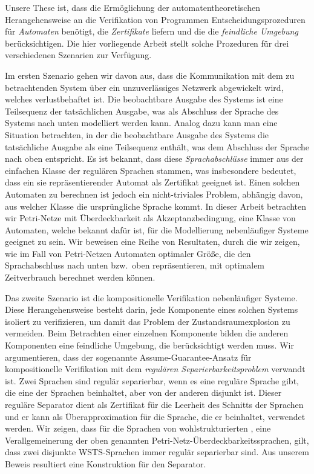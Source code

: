 \documentclass[../../diss.tex]{subfiles}
\begin{document}
{Unsere These ist, dass die Ermöglichung der automatentheoretischen Herangehensweise an die Verifikation von Programmen Entscheidungsprozeduren für \emph{Automaten} benötigt, die \emph{Zertifikate} liefern und die die \emph{feindliche Umgebung} berücksichtigen.
Die hier vorliegende Arbeit stellt solche Prozeduren für drei verschiedenen Szenarien zur Verfügung.

Im ersten Szenario gehen wir davon aus, dass die Kommunikation mit dem zu betrachtenden System über ein unzuverlässiges Netzwerk abgewickelt wird, welches verlustbehaftet ist.
Die beobachtbare Ausgabe des Systems ist eine Teilsequenz der tatsächlichen Ausgabe, was als Abschluss der Sprache des Systems nach unten modelliert werden kann.
Analog dazu kann man eine Situation betrachten, in der die beobachtbare Ausgabe des Systems die tatsächliche Ausgabe als eine Teilsequenz enthält, was dem Abschluss der Sprache nach oben entspricht.
Es ist bekannt, dass diese \emph{Sprachabschlüsse} immer aus der einfachen Klasse der regulären Sprachen stammen, was insbesondere bedeutet, dass ein sie repräsentierender Automat als Zertifikat geeignet ist.
Einen solchen Automaten zu berechnen ist jedoch ein nicht-triviales Problem, abhängig davon, aus welcher Klasse die ursprüngliche Sprache kommt.
In dieser Arbeit betrachten wir Petri-Netze mit Überdeckbarkeit als Akzeptanzbedingung, eine Klasse von Automaten, welche bekannt dafür ist, für die Modellierung nebenläufiger Systeme geeignet zu sein.
Wir beweisen eine Reihe von Resultaten, durch die wir zeigen, wie im Fall von Petri-Netzen Automaten optimaler Größe, die den Sprachabschluss nach unten bzw.~oben repräsentieren, mit optimalem Zeitverbrauch berechnet werden können.

Das zweite Szenario ist die kompositionelle Verifikation nebenläufiger Systeme.
Diese Herangehensweise besteht darin, jede Komponente eines solchen Systems isoliert zu verifizieren, um damit das Problem der Zustandsraumexplosion zu vermeiden.
Beim Betrachten einer einzelnen Komponente bilden die anderen Komponenten eine feindliche Umgebung, die berücksichtigt werden muss.
Wir argumentieren, dass der sogenannte Assume-Guarantee-Ansatz für kompositionelle Verifikation mit dem \emph{regulären Separierbarkeitsproblem} verwandt ist.
Zwei Sprachen sind regulär separierbar, wenn es eine reguläre Sprache gibt, die eine der Sprachen beinhaltet, aber von der anderen disjunkt ist.
Dieser reguläre Separator dient als Zertifikat für die Leerheit des Schnitts der Sprachen und er kann als Überapproximation für die Sprache, die er beinhaltet, verwendet werden.
Wir zeigen, dass für die Sprachen von wohlstrukturierten , eine Verallgemeinerung der oben genannten Petri-Netz-Überdeckbarkeitssprachen, gilt, dass zwei disjunkte WSTS-Sprachen immer regulär separierbar sind.
Aus unserem Beweis resultiert eine Konstruktion für den Separator.

}
\end{document}
